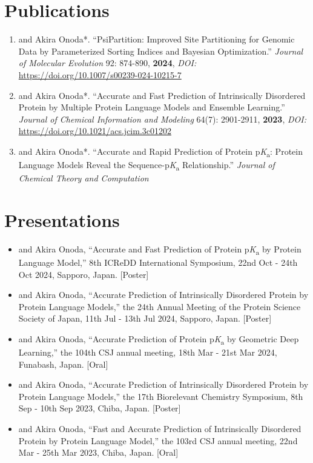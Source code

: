 \documentclass[a4paper,11pt]{article}
\newcommand{\pKa}{p\textit{K}\textsubscript{a}}
\begin{document}
\section*{Publications}
\begin{enumerate}
    \item {} and Akira Onoda*. ``PsiPartition: Improved Site Partitioning for Genomic Data by Parameterized Sorting Indices and Bayesian Optimization.'' \textit{Journal of Molecular Evolution} 92: 874-890, \textbf{2024}, \emph{DOI:} \url{https://doi.org/10.1007/s00239-024-10215-7}
    \item {} and Akira Onoda*. ``Accurate and Fast Prediction of Intrinsically Disordered Protein by Multiple Protein Language Models and Ensemble Learning.'' \textit{Journal of Chemical Information and Modeling} 64(7): 2901-2911, \textbf{2023}, \emph{DOI:} \url{https://doi.org/10.1021/acs.jcim.3c01202} 
    \item {} and Akira Onoda*. ``Accurate and Rapid Prediction of Protein \pKa{}: Protein Language Models Reveal the Sequence-\pKa{} Relationship.'' \textit{Journal of Chemical Theory and Computation}
\end{enumerate}
\section*{Presentations}
\begin{itemize}
    \item {} and Akira Onoda, ``Accurate and Fast Prediction of Protein \pKa{} by Protein Language Model,'' 8th ICReDD International Symposium, 22nd Oct - 24th Oct 2024, Sapporo, Japan. [Poster]
    \item {} and Akira Onoda, ``Accurate Prediction of Intrinsically Disordered Protein by Protein Language Models,'' the 24th Annual Meeting of the Protein Science Society of Japan, 11th Jul - 13th Jul 2024, Sapporo, Japan. [Poster]
    \item {} and Akira Onoda, ``Accurate Prediction of Protein \pKa{} by Geometric Deep Learning,'' the 104th CSJ annual meeting, 18th Mar - 21st Mar 2024, Funabash, Japan. [Oral]
    \item {} and Akira Onoda, ``Accurate Prediction of Intrinsically Disordered Protein by Protein Language Models,'' the 17th Biorelevant Chemistry Symposium, 8th Sep - 10th Sep 2023, Chiba, Japan. [Poster]
    \item {} and Akira Onoda, ``Fast and Accurate Prediction of Intrinsically Disordered Protein by Protein Language Model,'' the 103rd CSJ annual meeting, 22nd Mar - 25th Mar 2023, Chiba, Japan. [Oral] 
\end{itemize}
\end{document}
